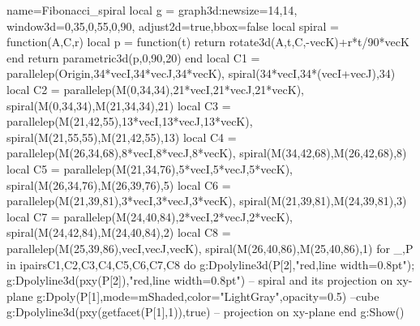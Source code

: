 \documentclass[12pt]{standalone}
\begin{document}
\begin{luadraw}{name=Fibonacci_spiral}
local g = graph3d:new{size={14,14}, window3d={0,35,0,55,0,90}, adjust2d=true,bbox=false}
local spiral = function(A,C,r)
    local p = function(t)
        return rotate3d(A,t,{C,-vecK})+r*t/90*vecK
    end
    return parametric3d(p,0,90,20)
end
local C1 = { parallelep(Origin,34*vecI,34*vecJ,34*vecK), spiral(34*vecI,34*(vecI+vecJ),34) }
local C2 = { parallelep(M(0,34,34),21*vecI,21*vecJ,21*vecK), spiral(M(0,34,34),M(21,34,34),21) }
local C3 = { parallelep(M(21,42,55),13*vecI,13*vecJ,13*vecK), spiral(M(21,55,55),M(21,42,55),13) }
local C4 = { parallelep(M(26,34,68),8*vecI,8*vecJ,8*vecK), spiral(M(34,42,68),M(26,42,68),8) }
local C5 = { parallelep(M(21,34,76),5*vecI,5*vecJ,5*vecK), spiral(M(26,34,76),M(26,39,76),5) }
local C6 = { parallelep(M(21,39,81),3*vecI,3*vecJ,3*vecK), spiral(M(21,39,81),M(24,39,81),3) }
local C7 = { parallelep(M(24,40,84),2*vecI,2*vecJ,2*vecK), spiral(M(24,42,84),M(24,40,84),2) }
local C8 = { parallelep(M(25,39,86),vecI,vecJ,vecK), spiral(M(26,40,86),M(25,40,86),1) }
for _,P in ipairs{C1,C2,C3,C4,C5,C6,C7,C8} do
    g:Dpolyline3d(P[2],"red,line width=0.8pt"); g:Dpolyline3d(pxy(P[2]),"red,line width=0.8pt") -- spiral and its projection on xy-plane
    g:Dpoly(P[1],{mode=mShaded,color="LightGray",opacity=0.5})  --cube
    g:Dpolyline3d(pxy(getfacet(P[1],1)),true) -- projection on xy-plane
end 
g:Show()
\end{luadraw}
\end{document}
